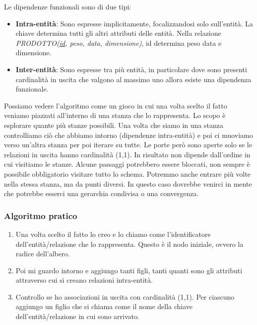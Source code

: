 Le dipendenze funzionali sono di due tipi:
\begin{itemize}
	\item \textbf{Intra-entità}: Sono espresse implicitamente, focalizzandosi solo sull'entità. La chiave determina tutti gli altri attributi delle entità. Nella relazione \textit{PRODOTTO(\underline{id}, peso, data, dimensione)}, id determina peso data e dimensione.
	\item \textbf{Inter-entità}: Sono espresse tra più entità, in particolare dove sono presenti cardinalità in uscita che valgono al massimo uno allora esiste una dipendenza funzionale.
\end{itemize}
\begin{info}[Il gioco:]
	Possiamo vedere l'algoritmo come un gioco in cui una volta scelto il fatto veniamo piazzati all'interno di una stanza che lo rappresenta. Lo scopo è esplorare quante più stanze possibili. Una volta che siamo in una stanza controlliamo ciò che abbiamo intorno (dipendenze intra-entità) e poi ci muoviamo verso un'altra stanza per poi iterare su tutte. Le porte però sono aperte solo se le relazioni in uscita hanno cardinalità (1,1). In risultato non dipende dall'ordine in cui visitiamo le stanze. Alcune passaggi potrebbero essere bloccati, non sempre è possibile obbligatorio visitare tutto lo schema. Potremmo anche entrare più volte nella stessa stanza, ma da punti diversi. In questo caso dovrebbe venirci in mente che potrebbe esserci una gerarchia condivisa o una convergenza.
\end{info}

\subsubsection{Algoritmo pratico}
\begin{enumerate}
	\item Una volta scelto il fatto lo creo e lo chiamo come l'identificatore dell'entità/relazione che lo rappresenta. Questo è il nodo iniziale, ovvero la radice dell'albero.
	\item Poi mi guardo intorno e aggiungo tanti figli, tanti quanti sono gli attributi attraverso cui si creano relazioni intra-entità.
	\item Controllo se ho associazioni in uscita con cardinalità (1,1). Per ciascuno aggiungo un figlio che si chiama come il nome della chiave dell'entità/relazione in cui sono arrivato.
\end{enumerate}

